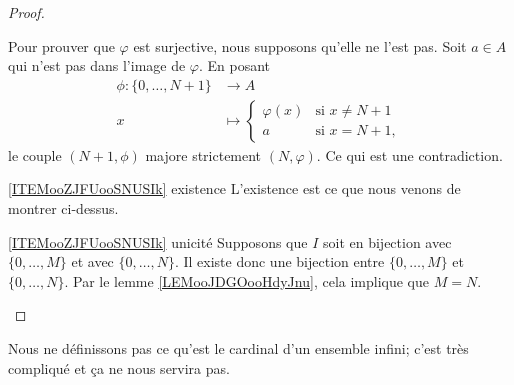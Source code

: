 \begin{proof}
\begin{subproof}
\begin{subproof}
        Pour prouver que \( \varphi\) est surjective, nous supposons qu'elle ne l'est pas. Soit \( a\in A\) qui n'est pas dans l'image de \( \varphi\). En posant
        \begin{equation}
            \begin{aligned}
                \phi\colon \{ 0,\ldots, N+1 \}&\to A \\
                x&\mapsto \begin{cases}
                    \varphi(x)    &   \text{si } x\neq N+1\\
                    a    &    \text{si } x=N+1,
                \end{cases}
            \end{aligned}
        \end{equation}
        le couple \( (N+1,\phi)\) majore strictement \( (N,\varphi)\). Ce qui est une contradiction.
    \end{subproof}
\item[\ref{ITEMooZJFUooSNUSIk} existence]
    L'existence est ce que nous venons de montrer ci-dessus.
\item[\ref{ITEMooZJFUooSNUSIk} unicité]
    Supposons que \( I\) soit en bijection avec \( \{ 0,\ldots, M \}\) et avec \( \{ 0,\ldots,N \}\). Il existe donc une bijection entre \(  \{ 0,\ldots, M \}\) et \( \{ 0,\ldots, N \}\). Par le lemme \ref{LEMooJDGOooHdyJnu}, cela implique que \( M=N\).
    \end{subproof}
\end{proof}
Nous ne définissons pas ce qu'est le cardinal d'un ensemble infini; c'est très compliqué et ça ne nous servira pas.

